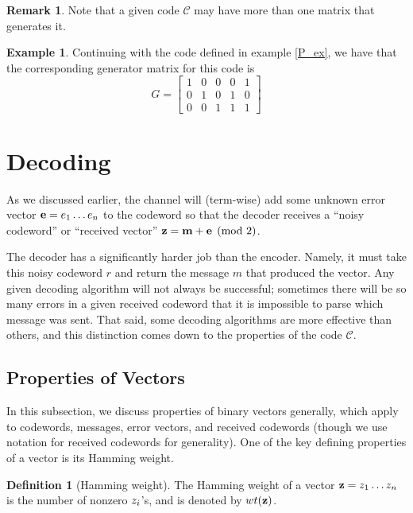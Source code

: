 \documentclass[12pt,twoside]{reedthesis}
\theoremstyle{definition}
\newtheorem{definition}[theorem]{Definition}
\newtheorem{example}[theorem]{Example}
\newtheorem{remark}[theorem]{Remark}
\begin{document}
\begin{remark}
Note that a given code $\mathscr{C}$ may have more than one matrix that generates it.
\end{remark}

\begin{example}
Continuing with the code defined in example \ref{P_ex}, we have that the corresponding generator matrix for this code is 
\begin{equation*}
G = 
\left[
\begin{array}{ccc|cc}
1 & 0 & 0 	& 0 & 1	  \\
0 & 1& 0	& 	1 & 0 \\
0 & 0 & 1 	& 1 & 1
\end{array}
\right]
\end{equation*}
\end{example}

\section{Decoding}
As we discussed earlier, the channel will (term-wise) add some unknown error vector $\mathbf{e}=e_{1} \ldots e_{n}$ to the codeword so that the decoder receives a ``noisy codeword'' or ``received vector'' $\mathbf{z} = \mathbf{m} + \mathbf{e} \pmod 2$. 

The decoder has a significantly harder job than the encoder. Namely, it must take this noisy codeword $r$ and return the message $m$ that produced the vector. Any given decoding algorithm will not always be successful; sometimes there will be so many errors in a given received codeword that it is impossible to parse which message was sent. That said, some decoding algorithms are more effective than others, and this distinction comes down to the properties of the code $\mathscr{C}$.

\subsection{Properties of Vectors}

In this subsection, we discuss properties of binary vectors generally, which apply to codewords, messages, error vectors, and received codewords (though we use notation for received codewords for generality). One of the key defining properties of a vector is its Hamming weight.
\begin{definition}[Hamming weight] The Hamming weight of a vector $\mathbf{z} = z_{1}  \ldots z_{n}$ is the number of nonzero $z_{i}$'s, and is denoted by $wt(\mathbf{z})$.
\end{definition}
\end{document}
